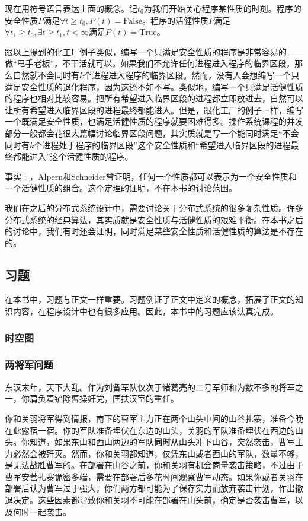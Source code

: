 \documentclass[UTF8,AutoFakeBold=1,AutoFakeSlant,zihao=-4]{cucthesis}
\begin{document}
现在用符号语言表达上面的概念。记$t_0$为我们开始关心程序某性质的时刻。程序的安全性质$P$满足$\forall t \geq t_0, P(t) = \text{False}$。程序的活健性质$P$满足$\forall t_1 \geq t_0, \exists t \geq t_1, t < \infty$满足$P(t) = \text{True}$。

跟以上提到的化工厂例子类似，编写一个只满足安全性质的程序是非常容易的——做“甩手老板”，不干活就可以。如果我们不允许任何进程进入程序的临界区段，那么自然就不会同时有$k$个进程进入程序的临界区段。然而，没有人会想编写一个只满足安全性质的退化程序，因为这还不如不写。类似地，编写一个只满足活健性质的程序也相对比较容易。把所有希望进入临界区段的进程都立即放进去，自然可以让所有希望进入临界区段的进程最终都能进入。但是，跟化工厂的例子一样，编写一个既满足安全性质，也满足活健性质的程序就要困难得多。操作系统课程的并发部分一般都会花很大篇幅讨论临界区段问题，其实质就是写一个能同时满足“不会同时有$k$个进程处于程序的临界区段”这个安全性质和“希望进入临界区段的进程最终都能进入”这个活健性质的程序。

事实上，Alpern和Schneider曾证明，任何一个性质都可以表示为一个安全性质和一个活健性质的组合。这个定理的证明，不在本书的讨论范围。

我们在之后的分布式系统设计中，需要讨论关于分布式系统的很多复杂性质。许多分布式系统的经典算法，其实质就是安全性质与活健性质的艰难平衡。在本书之后的讨论中，我们有时还会证明，同时满足某些安全性质和活健性质的算法是不存在的。

\subsection{习题}

在本书中，习题与正文一样重要。习题例证了正文中定义的概念，拓展了正文的知识内容，在程序设计中也有很多应用。因此，本书中的习题应该认真完成。

\subsubsection{时空图}

\subsubsection{两将军问题}

东汉末年，天下大乱。作为刘备军队仅次于诸葛亮的二号军师和为数不多的将军之一，你肩负着铲除曹操奸党，匡扶汉室的重任。

你和关羽将军得到情报，南下的曹军主力正在两个山头中间的山谷扎寨，准备今晚在此露宿一宿。你的军队准备埋伏在东边的山头，关羽的军队准备埋伏在西边的山头。你知道，如果东山和西山两边的军队\textbf{同时}从山头冲下山谷，突然袭击，曹军主力必然会被歼灭。然而，你和关羽都知道，仅凭东山或者西山的军队，数量不够，是无法战胜曹军的。在部署在山谷之前，你和关羽有机会商量袭击策略，不过由于曹军安营扎寨诡密多端，需要在部署后多花时间观察曹军动态。如果你或者关羽在部署后认为曹军过于强大，你们两方都可能为了保存实力而放弃袭击计划，作出撤退决定。这些因素都导致你和关羽不可能在部署在山头前，确定是否袭击曹军，以及何时一起袭击。
\end{document}
